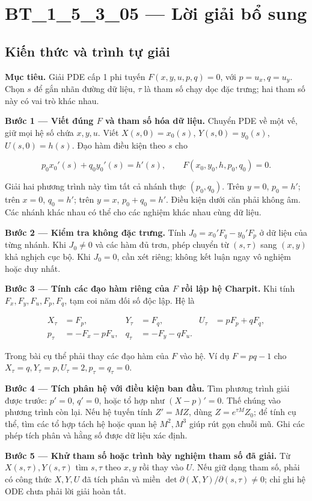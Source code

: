 \documentclass[10pt,a4paper]{article}
\begin{document}
\section*{BT\_1\_5\_3\_05 — Lời giải bổ sung}
\subsection*{Kiến thức và trình tự giải}
\textbf{Mục tiêu.} Giải PDE cấp 1 phi tuyến $F(x,y,u,p,q)=0$, với $p=u_x,q=u_y$. Chọn $s$ để gắn nhãn đường dữ liệu, $\tau$ là tham số chạy dọc đặc trưng; hai tham số này có vai trò khác nhau.

\textbf{Bước 1 — Viết đúng $F$ và tham số hóa dữ liệu.} Chuyển PDE về một vế, giữ mọi hệ số chứa $x,y,u$. Viết $X(s,0)=x_0(s)$, $Y(s,0)=y_0(s)$, $U(s,0)=h(s)$. Đạo hàm điều kiện theo $s$ cho

\[
p_0x_0'(s)+q_0y_0'(s)=h'(s),\qquad
F(x_0,y_0,h,p_0,q_0)=0.
\]

Giải hai phương trình này tìm tất cả nhánh thực $(p_0,q_0)$. Trên $y=0$, $p_0=h'$; trên $x=0$, $q_0=h'$; trên $y=x$, $p_0+q_0=h'$. Điều kiện dưới căn phải không âm. Các nhánh khác nhau có thể cho các nghiệm khác nhau cùng dữ liệu.

\textbf{Bước 2 — Kiểm tra không đặc trưng.} Tính $J_0=x_0'F_q-y_0'F_p$ ở dữ liệu của từng nhánh. Khi $J_0\ne0$ và các hàm đủ trơn, phép chuyển từ $(s,\tau)$ sang $(x,y)$ khả nghịch cục bộ. Khi $J_0=0$, cần xét riêng; không kết luận ngay vô nghiệm hoặc duy nhất.

\textbf{Bước 3 — Tính các đạo hàm riêng của $F$ rồi lập hệ Charpit.} Khi tính $F_x,F_y,F_u,F_p,F_q$, tạm coi năm đối số độc lập. Hệ là

\[
\begin{aligned}
X_\tau&=F_p,&Y_\tau&=F_q,&U_\tau&=pF_p+qF_q,\\
p_\tau&=-F_x-pF_u,&q_\tau&=-F_y-qF_u.
\end{aligned}
\]

Trong bài cụ thể phải thay các đạo hàm của $F$ vào hệ. Ví dụ $F=pq-1$ cho $X_\tau=q,Y_\tau=p,U_\tau=2,p_\tau=q_\tau=0$.

\textbf{Bước 4 — Tích phân hệ với điều kiện ban đầu.} Tìm phương trình giải được trước: $p'=0$, $q'=0$, hoặc tổ hợp như $(X-p)'=0$. Thế chúng vào phương trình còn lại. Nếu hệ tuyến tính $Z'=MZ$, dùng $Z=e^{\tau M}Z_0$; để tính cụ thể, tìm các tổ hợp tách hệ hoặc quan hệ $M^2, M^3$ giúp rút gọn chuỗi mũ. Ghi các phép tích phân và hằng số được dữ liệu xác định.

\textbf{Bước 5 — Khử tham số hoặc trình bày nghiệm tham số đã giải.} Từ $X(s,\tau),Y(s,\tau)$ tìm $s,\tau$ theo $x,y$ rồi thay vào $U$. Nếu giữ dạng tham số, phải có công thức $X,Y,U$ đã tích phân và miền $\det\partial(X,Y)/\partial(s,\tau)\ne0$; chỉ ghi hệ ODE chưa phải lời giải hoàn tất.
\end{document}
